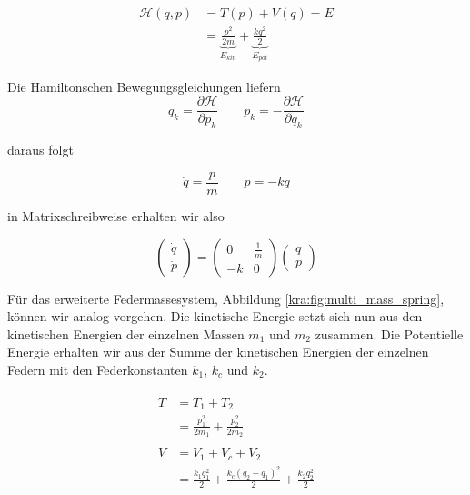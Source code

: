 \begin{equation}
    \label{kra:harmonischer_oszillator}
    \begin{split}
        \mathcal{H}(q, p) &= T(p) + V(q) = E \\
        &= \underbrace{\frac{p^2}{2m}}_{E_{kin}} + \underbrace{\frac{k q^2}{2}}_{E_{pot}}
    \end{split}
\end{equation}

Die Hamiltonschen Bewegungsgleichungen liefern \cite{kra:kanonischegleichungen}
\begin{equation}
    \label{kra:hamilton:bewegungsgleichung}
    \dot{q_{k}} = \frac{\partial \mathcal{H}}{\partial p_k}
    \qquad
    \dot{p_{k}} = -\frac{\partial \mathcal{H}}{\partial q_k}
\end{equation}

daraus folgt

\[
    \dot{q} = \frac{p}{m}
    \qquad
    \dot{p} = -kq
\]

in Matrixschreibweise erhalten wir also

\[
    \begin{pmatrix}
        \dot{q} \\
        \dot{p}
    \end{pmatrix}
    =
    \begin{pmatrix}
        0  & \frac{1}{m} \\
        -k & 0
    \end{pmatrix}
    \begin{pmatrix}
        q \\
        p
    \end{pmatrix}
\]

Für das erweiterte Federmassesystem, Abbildung \ref{kra:fig:multi_mass_spring}, können wir analog vorgehen.
Die kinetische Energie setzt sich nun aus den kinetischen Energien der einzelnen Massen $m_1$ und $m_2$ zusammen.
Die Potentielle Energie erhalten wir aus der Summe der kinetischen Energien der einzelnen Federn mit den Federkonstanten $k_1$, $k_c$ und $k_2$.

\begin{align*}
    \begin{split}
        T   &= T_1 + T_2 \\
        &= \frac{p_1^2}{2m_1} + \frac{p_2^2}{2m_2}
    \end{split}
    \\
    \begin{split}
        V   &= V_1 + V_c + V_2 \\
        &= \frac{k_1 q_1^2}{2} + \frac{k_c (q_2 - q_1)^2}{2} + \frac{k_2 q_2^2}{2}
    \end{split}
\end{align*}

